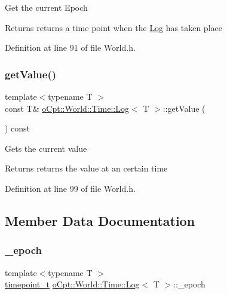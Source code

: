 Get the current Epoch \begin{DoxyReturn}{Returns}
returns a time point when the \hyperlink{classo_cpt_1_1_world_1_1_time_1_1_log}{Log} has taken place 
\end{DoxyReturn}


Definition at line 91 of file World.\+h.

\hypertarget{classo_cpt_1_1_world_1_1_time_1_1_log_a6ac8d303676d960e53c3ff2e39811cc3}{}\label{classo_cpt_1_1_world_1_1_time_1_1_log_a6ac8d303676d960e53c3ff2e39811cc3} 
\subsubsection{\texorpdfstring{get\+Value()}{getValue()}}
{\footnotesize\ttfamily template$<$typename T $>$ \\
const T\& \hyperlink{classo_cpt_1_1_world_1_1_time_1_1_log}{o\+Cpt\+::\+World\+::\+Time\+::\+Log}$<$ T $>$\+::get\+Value (\begin{DoxyParamCaption}{ }\end{DoxyParamCaption}) const\hspace{0.3cm}{\ttfamily [inline]}}

Gets the current value \begin{DoxyReturn}{Returns}
returns the value at an certain time 
\end{DoxyReturn}


Definition at line 99 of file World.\+h.



\subsection{Member Data Documentation}
\hypertarget{classo_cpt_1_1_world_1_1_time_1_1_log_a122e3702f277b998131f433829d1b67b}{}\label{classo_cpt_1_1_world_1_1_time_1_1_log_a122e3702f277b998131f433829d1b67b} 
\subsubsection{\texorpdfstring{\+\_\+epoch}{\_epoch}}
{\footnotesize\ttfamily template$<$typename T $>$ \\
\hyperlink{classo_cpt_1_1_world_1_1_time_a6a6e782c3c90622c1c7070b0a223ec4c}{timepoint\+\_\+t} \hyperlink{classo_cpt_1_1_world_1_1_time_1_1_log}{o\+Cpt\+::\+World\+::\+Time\+::\+Log}$<$ T $>$\+::\+\_\+epoch\hspace{0.3cm}{\ttfamily [private]}}



